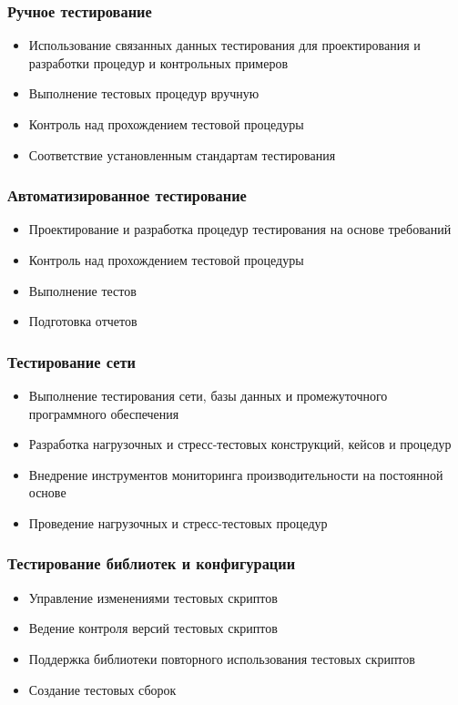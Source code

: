 \documentclass{../industrial-development}
\begin{document}
	\begin{frame} \frametitle{Ручное тестирование}
		\begin{itemize}
			\item Использование связанных данных тестирования для проектирования и разработки процедур и контрольных примеров
			\item Выполнение тестовых процедур вручную
			\item Контроль над прохождением тестовой процедуры
			\item Соответствие установленным стандартам тестирования
		\end{itemize}
	\end{frame}
	\begin{frame} \frametitle{Автоматизированное тестирование}
		\begin{itemize}
			\item Проектирование и разработка процедур тестирования на основе требований
			\item Контроль над прохождением тестовой процедуры
			\item Выполнение тестов
			\item Подготовка отчетов
		\end{itemize}
	\end{frame}
	\begin{frame} \frametitle{Тестирование сети}
		\begin{itemize}
			\item Выполнение тестирования сети, базы данных и промежуточного программного обеспечения
			\item Разработка нагрузочных и стресс-тестовых конструкций, кейсов и процедур
			\item Внедрение инструментов мониторинга производительности на постоянной основе
			\item Проведение нагрузочных и стресс-тестовых процедур
		\end{itemize}
	\end{frame}
	\begin{frame} \frametitle{Тестирование библиотек и конфигурации}
		\begin{itemize}
			\item Управление изменениями тестовых скриптов
			\item Ведение контроля версий тестовых скриптов
			\item Поддержка библиотеки повторного использования тестовых скриптов
			\item Создание тестовых сборок
		\end{itemize}
	\end{frame}
\end{document}
